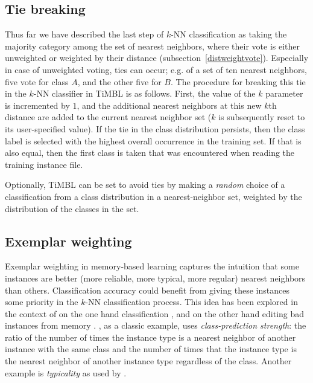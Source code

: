 \documentclass{report}
\begin{document}
\subsection{Tie breaking}
\label{tiebreaking}

Thus far we have described the last step of $k$-NN classification as
taking the majority category among the set of nearest neighbors, where
their vote is either unweighted or weighted by their distance
(subsection~\ref{distweightvote}). Especially in case of unweighted
voting, ties can occur; e.g. of a set of ten nearest neighbors, five
vote for class $A$, and the other five for $B$. The procedure for
breaking this tie in the $k$-NN classifier in TiMBL is as
follows. First, the value of the $k$ parameter is incremented by $1$,
and the additional nearest neighbors at this new $k$th distance are
added to the current nearest neighbor set ($k$ is subsequently reset
to its user-specified value). If the tie in the class distribution
persists, then the class label is selected with the highest overall
occurrence in the training set. If that is also equal, then the first
class is taken that was encountered when reading the training instance
file. 

Optionally, TiMBL can be set to avoid ties by making a {\em random}\/
choice of a classification from a class distribution in a
nearest-neighbor set, weighted by the distribution of the classes in
the set.

\subsection{Exemplar weighting}
\label{exemplar}

Exemplar weighting in memory-based learning captures the intuition
that some instances are better (more reliable, more typical, more
regular) nearest neighbors than others. Classification accuracy could
benefit from giving these instances some priority in the $k$-NN
classification process. This idea has been explored in the context of
on the one hand classification \cite{Salzberg90,Zhang92}, and on the
other hand editing bad instances from memory
\cite{Aha+91}. , as a classic example, uses {\em
class-prediction strength}: the ratio of the number of times the
instance type is a nearest neighbor of another instance with the same
class and the number of times that the instance type is the nearest
neighbor of another instance type regardless of the class. Another
example is {\em typicality}\/ as used by .
\end{document}
